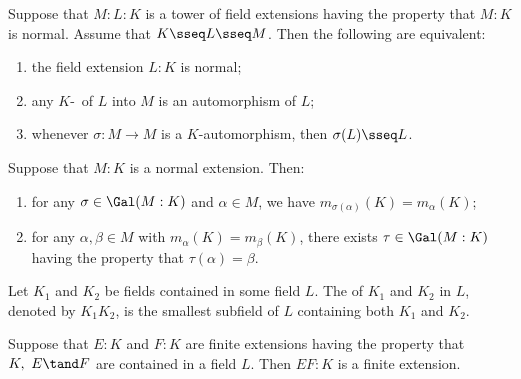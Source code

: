 \documentclass{article}
\begin{document}
  \begin{ttheorem}
    Suppose that $ M:L:K $ is a tower of field extensions having the property that $ M:K $ is normal.
    Assume that $ K\sseq L\sseq M $.
    Then the following are equivalent: \begin{enumerate}[label=(\roman*)]
      \item the field extension $ L:K $ is normal;
      \item any $ K $-\homo~of $ L $ into $ M $ is an automorphism of $ L $;
      \item whenever $ \sigma:M\to M $ is a $ K $-automorphism, then $ \sigma(L)\sseq L $.
    \end{enumerate}
  \end{ttheorem}

  \begin{tproposition}
    Suppose that $ M:K $ is a normal extension.
    Then: \begin{enumerate}[label=(\alph*)]
      \item for any $ \sigma\in\Gal(M:K) $ and $ \alpha\in M $, we have $ m_{\sigma(\alpha)}(K)=m_\alpha(K) $;
      \item for any $ \alpha,\beta\in M $ with $ m_\alpha(K)=m_\beta(K) $, there exists $ \tau\in\Gal(M:K) $ having the property that $ \tau(\alpha)=\beta $.
    \end{enumerate}
  \end{tproposition}

  \begin{tdefinition}[Compositum]
    Let $ K_1 $ and $ K_2 $ be fields contained in some field $ L $.
    The  of $ K_1 $ and $ K_2 $ in $ L $, denoted by $ K_1K_2 $, is the smallest subfield of $ L $ containing both $ K_1 $ and $ K_2 $.
  \end{tdefinition}

  \begin{tproposition}
    Suppose that $ E:K $ and $ F:K $ are finite extensions having the property that $ K,\ E\tand F $ are contained in a field $ L $.
    Then $ EF:K $ is a finite extension.
  \end{tproposition}
\end{document}
